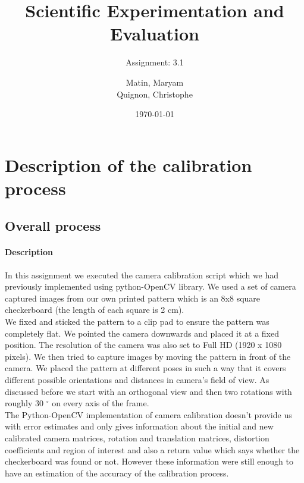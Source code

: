 \documentclass{scrartcl}
\begin{document}
\title{Scientific Experimentation and Evaluation
}
\subtitle{
Assignment: 3.1}
\author{
  Matin, Maryam \\
  Quignon, Christophe
}
\date{\today}


\maketitle


\section{Description of the calibration process}

\subsection{Overall process}
\paragraph{Description}

In this assignment we executed the camera calibration script which we had previously implemented using python-OpenCV library. We used a set of camera captured images from our own printed pattern which is an 8x8 square checkerboard (the length of each square is 2 cm).\\

We fixed and sticked the pattern to a clip pad to ensure the pattern was completely flat. We pointed the camera downwards and placed it at a fixed position. The resolution of the camera was also set to Full HD (1920 x 1080 pixels). We then tried to capture images by moving the pattern in front of the camera. We placed the pattern at different poses in such a way that it covers different  possible orientations and distances in camera's field of view. As discussed before we start with an orthogonal view and then two rotations with roughly 30 $^\circ $ on every axis of the frame.\\

The Python-OpenCV implementation of camera calibration doesn't provide us with error estimates and only gives information about the initial and new calibrated camera matrices, rotation and translation matrices, distortion coefficients and region of interest and also a return value which says whether the checkerboard was found or not. However these information were still enough to have an estimation of the accuracy of the calibration process.\\
\end{document}
